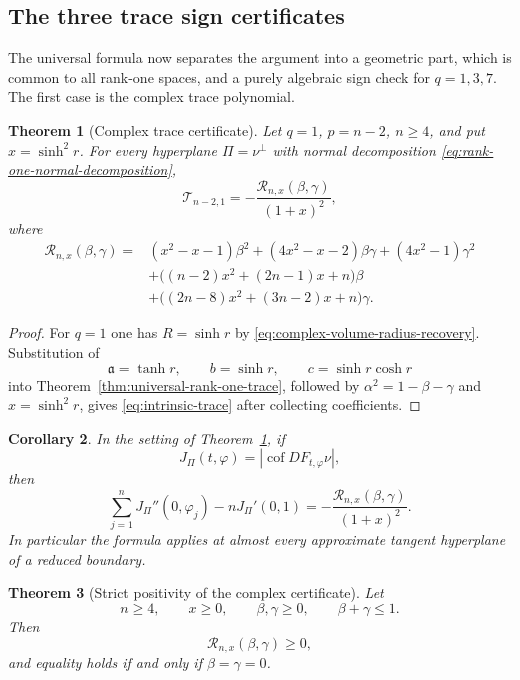 \documentclass[11pt,reqno]{amsart}
\numberwithin{equation}{section}
\newtheorem{theorem}{Theorem}[section]
\newtheorem{corollary}[theorem]{Corollary}
\theoremstyle{definition}
\theoremstyle{remark}
\newcommand{\cof}{\operatorname{cof}}
\begin{document}
\subsection{The three trace sign certificates}

The universal formula now separates the argument into a geometric part,
which is common to all rank-one spaces, and a purely algebraic sign check for
$q=1,3,7$.  The first case is the complex trace polynomial.

\begin{theorem}[Complex trace certificate]
\label{thm:intrinsic-trace}
Let $q=1$, $p=n-2$, $n\ge4$, and put $x=\sinh^2r$.  For every hyperplane
$\Pi=\nu^\perp$ with normal decomposition
\eqref{eq:rank-one-normal-decomposition},
\begin{equation}
 \mathscr T_{n-2,1}
 =-\frac{\mathcal R_{n,x}(\beta,\gamma)}{(1+x)^2},
 \label{eq:intrinsic-trace}
\end{equation}
where
\begin{equation}
\begin{aligned}
\mathcal R_{n,x}(\beta,\gamma)
={}&(x^2-x-1)\beta^2
 +(4x^2-x-2)\beta\gamma
 +(4x^2-1)\gamma^2
\\
&+\bigl((n-2)x^2+(2n-1)x+n\bigr)\beta
\\
&+\bigl((2n-8)x^2+(3n-2)x+n\bigr)\gamma.
\end{aligned}
\label{eq:R-polynomial}
\end{equation}
\end{theorem}

\begin{proof}
For $q=1$ one has $R=\sinh r$ by
\eqref{eq:complex-volume-radius-recovery}.  Substitution of
\[
 \mathfrak a=\tanh r,\qquad b=\sinh r,\qquad
 c=\sinh r\cosh r
\]
into Theorem~\ref{thm:universal-rank-one-trace}, followed by
$\alpha^2=1-\beta-\gamma$ and $x=\sinh^2r$, gives
\eqref{eq:intrinsic-trace} after collecting coefficients.
\end{proof}

\begin{corollary}
\label{cor:tangent-plane-trace}
In the setting of Theorem~\ref{thm:intrinsic-trace}, if
\[
 J_\Pi(t,\varphi)=|\cof DF_{t,\varphi}\nu|,
\]
then
\[
 \sum_{j=1}^nJ_\Pi''(0,\varphi_j)-nJ_\Pi'(0,1)
 =-\frac{\mathcal R_{n,x}(\beta,\gamma)}{(1+x)^2}.
\]
In particular the formula applies at almost every approximate tangent
hyperplane of a reduced boundary.
\end{corollary}

\begin{theorem}[Strict positivity of the complex certificate]
\label{thm:strict-positivity}
Let
\[
 n\ge4,\qquad x\ge0,\qquad
 \beta,\gamma\ge0,\qquad \beta+\gamma\le1.
\]
Then
\[
 \mathcal R_{n,x}(\beta,\gamma)\ge0,
\]
and equality holds if and only if $\beta=\gamma=0$.
\end{theorem}
\end{document}
